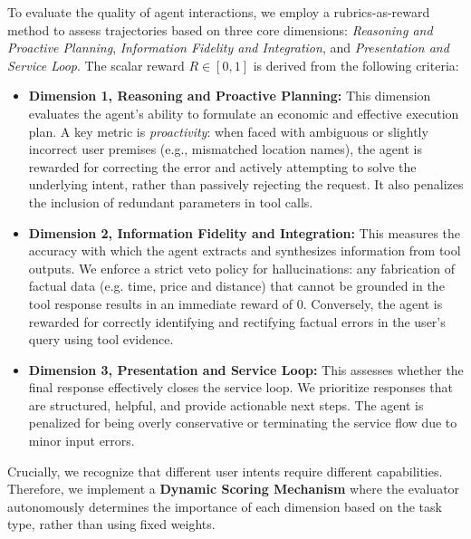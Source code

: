 \documentclass{article} %
\begin{document}
To evaluate the quality of agent interactions, we employ a rubrics-as-reward~\citep{hashemi2024llm,gunjal2025rubrics} method to assess trajectories based on three core dimensions: \textit{Reasoning and Proactive Planning}, \textit{Information Fidelity and Integration}, and \textit{Presentation and Service Loop}. The scalar reward $R \in [0, 1]$ is derived from the following criteria:
\begin{itemize}
    \item \textbf{Dimension 1, Reasoning and Proactive Planning:} This dimension evaluates the agent's ability to formulate an economic and effective execution plan. A key metric is \textit{proactivity}: when faced with ambiguous or slightly incorrect user premises (e.g., mismatched location names), the agent is rewarded for correcting the error and actively attempting to solve the underlying intent, rather than passively rejecting the request. It also penalizes the inclusion of redundant parameters in tool calls.
    
    \item \textbf{Dimension 2, Information Fidelity and Integration:} This measures the accuracy with which the agent extracts and synthesizes information from tool outputs. We enforce a strict veto policy for hallucinations: any fabrication of factual data (e.g. time, price and distance) that cannot be grounded in the tool response results in an immediate reward of $0$. Conversely, the agent is rewarded for correctly identifying and rectifying factual errors in the user's query using tool evidence.
    
    \item \textbf{Dimension 3, Presentation and Service Loop:} This assesses whether the final response effectively closes the service loop. We prioritize responses that are structured, helpful, and provide actionable next steps. The agent is penalized for being overly conservative or terminating the service flow due to minor input errors.
\end{itemize}

Crucially, we recognize that different user intents require different capabilities. Therefore, we implement a \textbf{Dynamic Scoring Mechanism} where the evaluator autonomously determines the importance of each dimension based on the task type, rather than using fixed weights.
\end{document}
